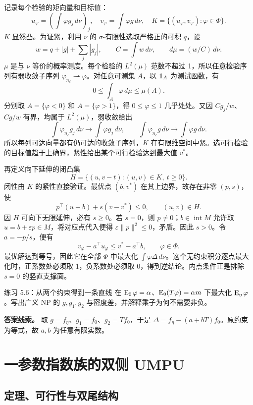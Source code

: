 记录每个检验的矩向量和目标值：
\[
 u_\varphi=\left(\int\varphi g_j\,d\nu\right)_j,
 \quad v_\varphi=\int\varphi g\,d\nu,
 \quad K=\{(u_\varphi,v_\varphi):\varphi\in\Phi\}.
\]
$K$ 显然凸。为证紧，利用 $\nu$ 的 $\sigma$-有限性选取严格正的可积 $q$，设
\[
 w=q+|g|+\sum_j|g_j|,\qquad
 C=\int w\,d\nu,\qquad d\mu=(w/C)\,d\nu.
\]
$\mu$ 是与 $\nu$ 等价的概率测度。每个检验的 $L^2(\mu)$ 范数不超过 1，所以任意检验序列有弱收敛子序列 $\varphi_{n_\ell}\rightharpoonup\varphi$。对任意可测集 $A$，以 $\mathbf 1_A$ 为测试函数，有
\[
 0\le\int_A\varphi\,d\mu\le\mu(A).
\]
分别取 $A=\{\varphi<0\}$ 和 $A=\{\varphi>1\}$，得 $0\le\varphi\le1$ 几乎处处。又因 $Cg_j/w$、$Cg/w$ 有界，均属于 $L^2(\mu)$，弱收敛给出
\[
 \int\varphi_{n_\ell}g_j\,d\nu\longrightarrow\int\varphi g_j\,d\nu,
 \qquad
 \int\varphi_{n_\ell}g\,d\nu\longrightarrow\int\varphi g\,d\nu.
\]
所以每列可达向量都有仍可达的收敛子序列，$K$ 在有限维空间中紧。选可行检验的目标值趋于上确界，紧性给出某个可行检验达到最大值 $v^*$。

再定义向下延伸的闭凸集
\[
 H=\{(u,v-t):(u,v)\in K,\ t\ge0\}.
\]
闭性由 $K$ 的紧性直接验证。最优点 $(b,v^*)$ 在其上边界，故存在非零 $(p,s)$，使
\[
 p^\top(u-b)+s(v-v^*)\le0,\qquad (u,v)\in H.
\]
因 $H$ 可向下无限延伸，必有 $s\ge0$。若 $s=0$，则 $p\ne0$；$b\in\operatorname{int}M$ 允许取 $u=b+\varepsilon p\in M$，将对应点代入便得 $\varepsilon\|p\|^2\le0$，矛盾。因此 $s>0$。令 $a=-p/s$，便有
\[
 v_\varphi-a^\top u_\varphi\le v^*-a^\top b,
 \qquad\varphi\in\Phi.
\]
最优解达到等号，因此它在全部 $\Phi$ 中最大化
$\int\varphi\Delta\,d\nu$。这个无约束积分逐点最大化时，正系数处必须取 1，负系数处必须取 0，得到逆结论。内点条件正是排除 $s=0$ 的竖直支撑面。

\begin{examplebox}{练习 5.6：从两个约束得到一条直线}
在 $\operatorname{E}_0\varphi=\alpha$、$\operatorname{E}_0(T\varphi)=\alpha m$ 下最大化 $\operatorname{E}_\eta\varphi$。写出广义 NP 的 $g,g_1,g_2$ 与密度差，并解释乘子为何不需要非负。

\textbf{答案线索。} 取 $g=f_\eta$、$g_1=f_0$、$g_2=Tf_0$，于是 $\Delta=f_\eta-(a+bT)f_0$。原约束为等式，故 $a,b$ 为任意有限实数。
\end{examplebox}

\section{一参数指数族的双侧 UMPU}

\subsection{定理、可行性与双尾结构}

